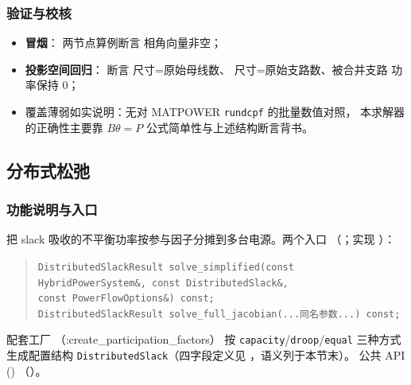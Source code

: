 \subsubsection*{验证与校核}
\begin{itemize}
  \item \textbf{冒烟}： 两节点算例断言
        相角向量非空；
  \item \textbf{投影空间回归}：
        断言  尺寸=原始母线数、 尺寸=原始支路数、被合并支路
        功率保持 0；
  \item 覆盖薄弱如实说明：无对 MATPOWER \texttt{rundcpf} 的批量数值对照，
        本求解器的正确性主要靠 $B\theta=P$ 公式简单性与上述结构断言背书。
\end{itemize}

\subsection{分布式松弛}


\subsubsection*{功能说明与入口}
把 slack 吸收的不平衡功率按参与因子分摊到多台电源。两个入口
（；实现
）：
\begin{quote}\footnotesize
\texttt{DistributedSlackResult solve\_simplified(const HybridPowerSystem\&, const DistributedSlack\&,\\
\hspace*{2em}const PowerFlowOptions\&) const;}\\
\texttt{DistributedSlackResult solve\_full\_jacobian(...同名参数...) const;}
\end{quote}
配套工厂 （:create\_participation\_factors）
按 \texttt{capacity}/\texttt{droop}/\texttt{equal} 三种方式生成配置结构
\texttt{DistributedSlack}（四字段定义见
，语义列于本节末）。
公共 API ()
（）。

